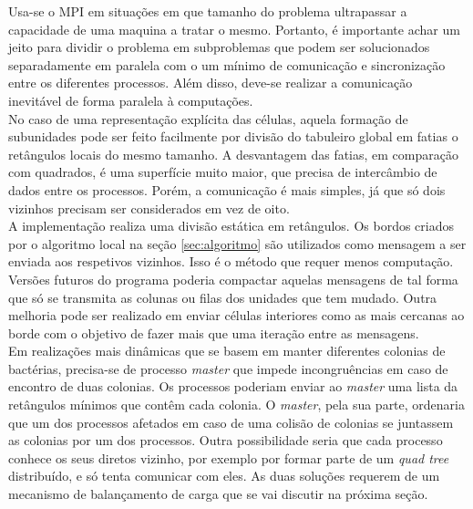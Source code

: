 \label{sec:distribuicao}

Usa-se o MPI em situações em que tamanho do problema ultrapassar a capacidade de uma maquina a tratar o mesmo. Portanto, é importante achar um jeito para dividir o problema em subproblemas que podem ser solucionados separadamente em paralela com o um mínimo de comunicação e sincronização entre os diferentes processos. Além disso, deve-se realizar a comunicação inevitável de forma paralela à computações. \\

No caso de uma representação explícita das células, aquela formação de subunidades pode ser feito facilmente por divisão do tabuleiro global em fatias o retângulos locais do mesmo tamanho. A desvantagem das fatias, em comparação com quadrados, é uma superfície muito maior, que precisa de intercâmbio de dados entre os processos. Porém, a comunicação é mais simples, já que só dois vizinhos precisam ser considerados em vez de oito.\\

A implementação realiza uma divisão estática em retângulos. Os bordos criados por o algoritmo local na seção \ref{sec:algoritmo} são utilizados como mensagem a ser enviada aos respetivos vizinhos. Isso é o método que requer menos computação. Versões futuros do programa poderia compactar aquelas mensagens de tal forma que só se transmita as colunas ou filas dos unidades que tem mudado. Outra melhoria pode ser realizado em enviar células interiores como as mais cercanas ao borde com o objetivo de fazer mais que uma iteração entre as mensagens.\\

Em realizações mais dinâmicas que se basem em manter diferentes colonias de bactérias, precisa-se de processo \textit{master} que impede incongruências em caso de encontro de duas colonias. Os processos poderiam enviar ao \textit{master} uma lista da retângulos mínimos que contêm cada colonia. O \textit{master}, pela sua parte, ordenaria que um dos processos afetados em caso de uma colisão de colonias se juntassem as colonias por um dos processos. Outra possibilidade seria que cada processo conhece os seus diretos vizinho, por exemplo por formar parte de um \textit{quad tree} distribuído, e só tenta comunicar com eles. As duas soluções requerem de um mecanismo de balançamento de carga que se vai discutir na próxima seção.

